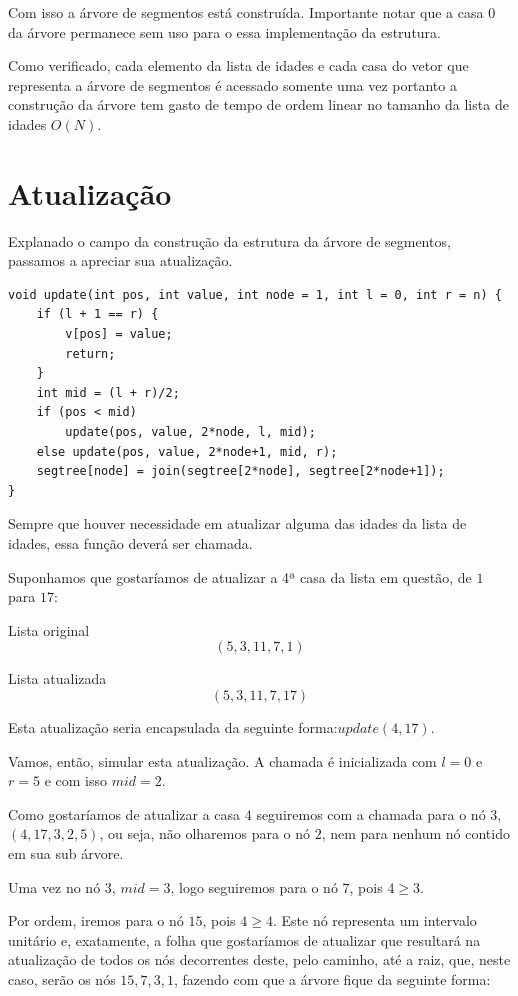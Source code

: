 Com isso a árvore de segmentos está construída. Importante notar que a casa $0$ da árvore permanece sem uso para o essa implementação da estrutura.

Como verificado, cada elemento da lista de idades e cada casa do vetor que representa a árvore de segmentos é acessado somente uma vez portanto a construção da árvore tem gasto de tempo de ordem linear no tamanho da lista de idades $O(N)$.

\section{Atualização}
Explanado o campo da construção da estrutura da árvore de segmentos, passamos a apreciar sua atualização.

\begin{lstlisting}
void update(int pos, int value, int node = 1, int l = 0, int r = n) {
    if (l + 1 == r) {
        v[pos] = value;
        return;
    }
    int mid = (l + r)/2;
    if (pos < mid)
        update(pos, value, 2*node, l, mid);
    else update(pos, value, 2*node+1, mid, r);
    segtree[node] = join(segtree[2*node], segtree[2*node+1]);
}
\end{lstlisting}

Sempre que houver necessidade em atualizar alguma das idades da lista de idades, essa função deverá ser chamada.

Suponhamos que gostaríamos de atualizar a 4ª casa da lista em questão, de $1$ para $17$:

Lista original $$(5, 3, 11, 7, 1)$$

Lista atualizada $$(5, 3, 11, 7, 17)$$

Esta atualização seria encapsulada da seguinte forma:$update(4, 17)$.

Vamos, então, simular esta atualização. A chamada é inicializada com $l = 0$ e $r = 5$ e com isso $mid = 2$. 

Como gostaríamos de atualizar a casa $4$ seguiremos com a chamada para o nó $3$, $(4, 17, 3, 2, 5)$, ou seja, não olharemos para o nó $2$, nem para nenhum nó contido em sua sub árvore.

Uma vez no nó $3$, $mid = 3$, logo seguiremos para o nó $7$, pois $4 \geq 3$.

Por ordem, iremos para o nó $15$, pois $4 \geq 4$. Este nó representa um intervalo unitário e, exatamente, a folha que gostaríamos de atualizar que resultará na atualização de todos os nós decorrentes deste, pelo caminho, até a raiz, que, neste caso, serão os nós $15, 7, 3, 1$, fazendo com que a árvore fique da seguinte forma:

